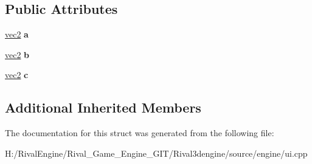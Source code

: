 \subsection*{Public Attributes}
\begin{DoxyCompactItemize}
\item 
\mbox{\label{struct_u_i_1_1_triangle_a52bee54a39bad8bd469df7e3b3ffa6f7}} 
\hyperlink{structvec2}{vec2} {\bfseries a}
\item 
\mbox{\label{struct_u_i_1_1_triangle_a373ac981e03500d4429b28f4669e52f6}} 
\hyperlink{structvec2}{vec2} {\bfseries b}
\item 
\mbox{\label{struct_u_i_1_1_triangle_ad81e295280e5ce0aa4112c5e2ed4d7d4}} 
\hyperlink{structvec2}{vec2} {\bfseries c}
\end{DoxyCompactItemize}
\subsection*{Additional Inherited Members}


The documentation for this struct was generated from the following file\+:\begin{DoxyCompactItemize}
\item 
H\+:/\+Rival\+Engine/\+Rival\+\_\+\+Game\+\_\+\+Engine\+\_\+\+G\+I\+T/\+Rival3dengine/source/engine/ui.\+cpp\end{DoxyCompactItemize}

